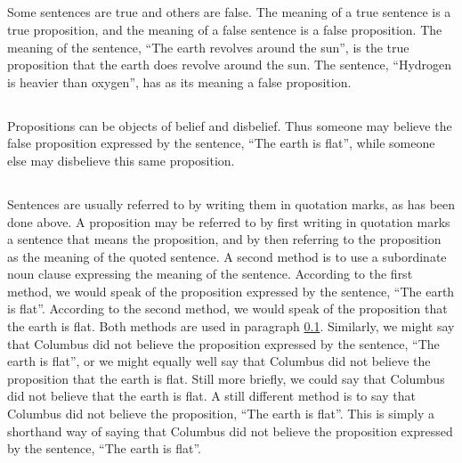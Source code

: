 \documentclass{book}
\let\oldmarginpar\marginpar
\renewcommand*{\marginpar}[1]{\oldmarginpar{\footnotesize#1}}
\begin{document}
\subsection{}
\label{sec:2.4}

Some sentences are true and others are false.  The meaning of a true sentence is a true proposition, and the meaning of a false sentence is a false proposition.  The meaning of the sentence, “The earth revolves around the sun”, is the true proposition that the earth does revolve around the sun.  The sentence, “Hydrogen is heavier than oxygen”, has as its meaning a false proposition.

\subsection{}
\label{sec:2.5}

Propositions can be objects of belief and disbelief.  Thus someone may believe the false proposition expressed by the sentence, “The earth is flat”, while someone else may disbelieve this same proposition.

\subsection{}
\label{sec:2.6}

Sentences are usually referred to by writing them in quotation marks, as has been done above.  A proposition may be referred to by first writing in quotation marks a sentence that means the proposition, and by then referring to the proposition as the meaning of the quoted sentence.  A second method is to use a subordinate noun clause expressing the meaning of the sentence.  According to the first method, we would speak of the proposition expressed by the sentence, “The earth is flat”.  According to the second method, we would speak of the proposition that the earth is flat.  Both methods are used in paragraph \ref{sec:2.4}.  Similarly, we might say that Columbus did not believe the proposition expressed by the sentence, “The earth is flat”, or we might equally well say that Columbus did not believe the proposition that the earth is flat.  Still more briefly, we could \marginpar{7}say that Columbus did not believe that the earth is flat.  A still different method is to say that Columbus did not believe the proposition, “The earth is flat”.  This is simply a shorthand way of saying that Columbus did not believe the proposition expressed by the sentence, “The earth is flat”.

\subsection{}
\label{sec:2.7}
\end{document}
